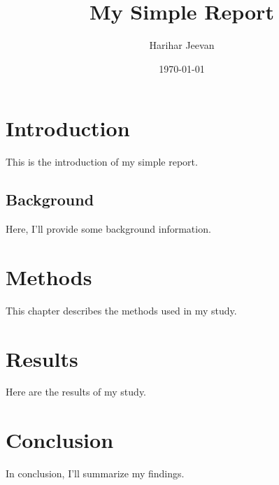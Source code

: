 \documentclass{report}
\title{My Simple Report}
\author{Harihar Jeevan}
\date {\today}
\begin{document}
	\maketitle
	\tableofcontents
	\chapter{Introduction}
	This is the introduction of my simple report.
	\section{Background}
	Here, I'll provide some background information.
	\chapter{Methods}
	This chapter describes the methods used in my study.
	\chapter{Results}
	Here are the results of my study.
	\chapter{Conclusion}
	In conclusion, I'll summarize my findings.
\end{document}
